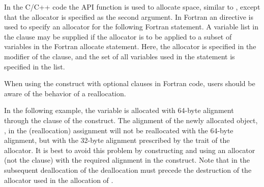 
In the C/C++ code the API   function is used
to allocate space, similar to , except that the allocator
is specified as the second argument.
In Fortran an  directive is used to specify an allocator
for the following Fortran  statement.
A variable list in the  clause may be supplied if the allocator
is to be applied to a subset of variables in the Fortran allocate
statement.
Here, the  allocator is specified
in the modifier of the  clause,
and the set of all variables used in the  statement is specified in the list.




When using the  construct with optional clauses in Fortran code, 
users should be aware of the behavior of a reallocation.

In the following example, the  variable is allocated with 64-byte
alignment through the  clause of the  construct.
The alignment of the newly allocated object, , in the (reallocation)
assignment  will not be reallocated with the 64-byte alignment, but
with the 32-byte alignment prescribed by the trait of the  
allocator. It is best to avoid this problem by constructing and using an
allocator (not the  clause) with the required alignment in 
the  construct.
Note that in the subsequent
deallocation of  the deallocation must precede the destruction
of the allocator used in the allocation of .

